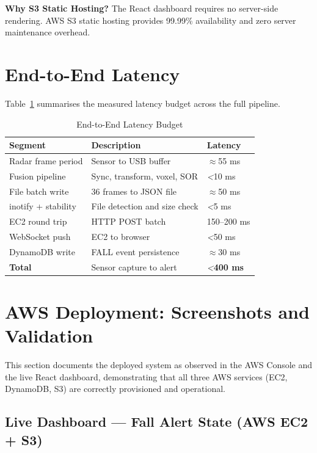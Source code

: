 \textbf{Why S3 Static Hosting?} The React dashboard requires no server-side rendering. AWS S3 static hosting provides 99.99\% availability and zero server maintenance overhead.


\section{End-to-End Latency}
\label{sec:latency}

Table~\ref{tab:latency_budget} summarises the measured latency budget across the full pipeline.

\begin{table}[H]
\caption{End-to-End Latency Budget}
\label{tab:latency_budget}
\centering
\begin{tabularx}{\textwidth}{@{} l X X @{}}
\toprule
\textbf{Segment} & \textbf{Description} & \textbf{Latency} \\ \midrule
Radar frame period & Sensor to USB buffer & \textit{$\approx$}55 ms \\
Fusion pipeline & Sync, transform, voxel, SOR & \textit{<}10 ms \\
File batch write & 36 frames to JSON file & \textit{$\approx$}50 ms \\
inotify + stability & File detection and size check & \textit{<}5 ms \\
EC2 round trip & HTTP POST batch & 150--200 ms \\
WebSocket push & EC2 to browser & \textit{<}50 ms \\
DynamoDB write & FALL event persistence & \textit{$\approx$}30 ms \\
\textbf{Total} & Sensor capture to alert & \textit{<}\textbf{400 ms} \\ \bottomrule
\end{tabularx}
\end{table}


\section{AWS Deployment: Screenshots and Validation}

This section documents the deployed system as observed in the AWS Console and the live React dashboard, demonstrating that all three AWS services (EC2, DynamoDB, S3) are correctly provisioned and operational.

\subsection{Live Dashboard --- Fall Alert State (AWS EC2 + S3)}

